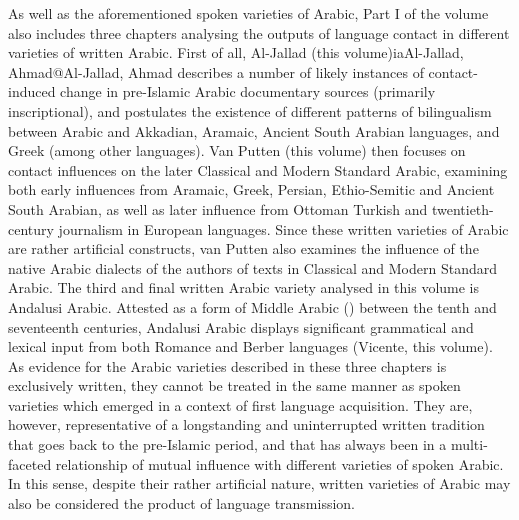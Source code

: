 \documentclass[output=paper]{langsci/langscibook}
\begin{document}
As well as the aforementioned spoken varieties of Arabic, Part I of the volume also includes three chapters analysing the outputs of language contact in different varieties of written Arabic. First of all, Al-Jallad (this volume)ia{Al-Jallad, Ahmad@Al-Jallad, Ahmad} describes a number of likely instances of contact-induced change in pre-Islamic Arabic documentary sources (primarily inscriptional), and postulates the existence of different patterns of bilingualism between Arabic and Akkadian, Aramaic, Ancient South Arabian languages, and Greek (among other languages). Van Putten (this volume) then focuses on contact influences on the later Classical and Modern Standard Arabic, examining both early influences from Aramaic, Greek, Persian, Ethio-Semitic and Ancient South Arabian, as well as later influence from Ottoman Turkish and twentieth-century journalism in European languages. Since these written varieties of Arabic are rather artificial constructs, van Putten also examines the influence of the native Arabic dialects of the authors of texts in Classical and Modern Standard Arabic. The third and final written Arabic variety analysed in this volume is Andalusi Arabic. Attested as a form of Middle Arabic (\citealt{Lentin2011Middle}) between the tenth and seventeenth centuries, Andalusi Arabic displays significant grammatical and lexical input from both Romance and Berber languages (Vicente, this volume). As evidence for the Arabic varieties described in these three chapters is exclusively written, they cannot be treated in the same manner as spoken varieties which emerged in a context of first language acquisition. They are, however, representative of a longstanding and uninterrupted written tradition that goes back to the pre-Islamic period, and that has always been in a multi-faceted relationship of mutual influence with different varieties of spoken Arabic. In this sense, despite their rather artificial nature, written varieties of Arabic may also be considered the product of language transmission. 
\end{document}
